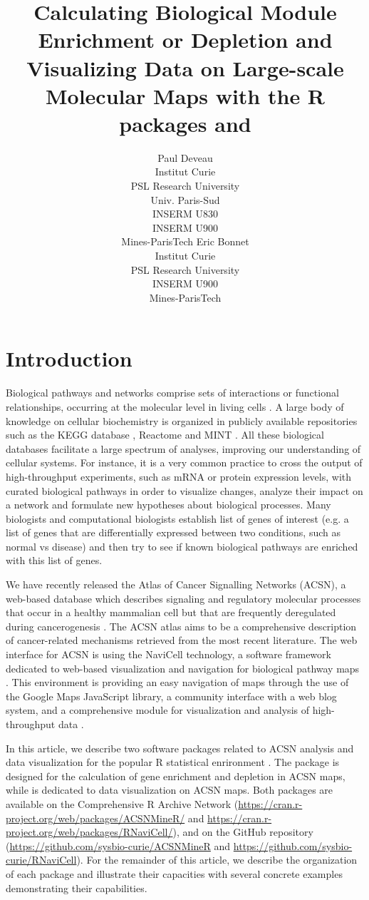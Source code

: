 \documentclass[article]{jss}
\author{Paul Deveau\\Institut Curie\\PSL Research University\\Univ. Paris-Sud\\INSERM U830\\INSERM U900\\Mines-ParisTech \And 
        Eric Bonnet\\Institut Curie\\PSL Research University\\INSERM U900\\Mines-ParisTech}
\title{Calculating Biological Module Enrichment or Depletion and Visualizing Data on Large-scale Molecular Maps with the R packages \pkg{ACSNMineR} and \pkg{RNaviCell}}
\begin{document}

\section[Introduction]{Introduction}
Biological pathways and networks comprise sets of interactions or functional
relationships, occurring at the molecular level in living cells
\citep{adriaens2008public}.  A large body of knowledge on cellular biochemistry
is organized in publicly available repositories such as the KEGG database
\citep{kanehisa2011kegg}, Reactome \citep{croft2014reactome} and MINT
\citep{zanzoni2002mint}. All these biological databases facilitate a large
spectrum of analyses, improving our understanding of cellular systems. For
instance, it is a very common practice to cross the output of high-throughput
experiments, such as mRNA or protein expression levels, with curated biological
pathways in order to visualize changes, analyze their impact on a network and
formulate new hypotheses about biological processes. Many biologists and
computational biologists establish list of genes of interest (e.g. a list of
genes that are differentially expressed between two conditions, such as normal
vs disease) and then try to see if known biological pathways are enriched with
this list of genes. 

We have recently released the Atlas of Cancer Signalling Networks (ACSN), a
web-based database which describes signaling and regulatory molecular processes
that occur in a healthy mammalian cell but that are frequently deregulated
during cancerogenesis \citep{kuperstein2013navicell}.  The ACSN atlas aims to
be a comprehensive description of cancer-related mechanisms retrieved from the
most recent literature. The web interface for ACSN is using the NaviCell
technology, a software framework dedicated to web-based visualization and
navigation for biological pathway maps \citep{kuperstein2013navicell}. This
environment is providing an easy navigation of maps through the use of the
Google Maps JavaScript library, a community interface with a web blog system,
and a comprehensive module for visualization and analysis of high-throughput
data \citep{bonnet2015navicell}.


In this article, we describe two software packages related to ACSN analysis and
data visualization for the popular R statistical enrironment \citep{mainRref,
vance2009data}. The package  is designed for the calculation of
gene enrichment and depletion in ACSN maps, while  is dedicated
to data visualization on ACSN maps. Both packages are available on the
Comprehensive R Archive Network
(\url{https://cran.r-project.org/web/packages/ACSNMineR/} and
\url{https://cran.r-project.org/web/packages/RNaviCell/}), and on the GitHub
repository (\url{https://github.com/sysbio-curie/ACSNMineR} and
\url{https://github.com/sysbio-curie/RNaviCell}). For the remainder of this
article, we describe the organization of each package and illustrate their
capacities with several concrete examples demonstrating their capabilities. 
\end{document}
